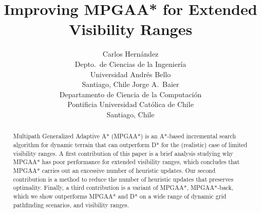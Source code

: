 \documentclass{article}
\begin{document}

\title{Improving MPGAA* for Extended Visibility Ranges}

 \author{ 
   Carlos Hern\'andez\\
   Depto.\ de Ciencias de la Ingenier\'ia\\
   Universidad Andr\'es Bello \\
   Santiago, Chile
   \And
 Jorge A.\ Baier \\
 Departamento de Ciencia de la Computaci\'{o}n\\
 Pontificia Universidad Cat\'olica de Chile \\%
 Santiago, Chile
 }




\maketitle


\begin{abstract}
Multipath Generalized Adaptive A* (MPGAA*) is an A*-based incremental
search algorithm for dynamic terrain that can outperform D* for the (realistic) case of limited visibility ranges.
A first contribution of this paper is a brief analysis studying why MPGAA* has poor performance for extended visibility ranges, which concludes that
MPGAA* carries out an excessive number of heuristic updates. Our second
contribution is a method to reduce the number of heuristic updates that
preserves optimality. Finally, a third contribution is a variant of MPGAA*, MPGAA*-back, which we show outperforms MPGAA* and D* on a wide range of dynamic grid pathfinding scenarios, and visibility ranges.
\end{abstract}


\end{document}
